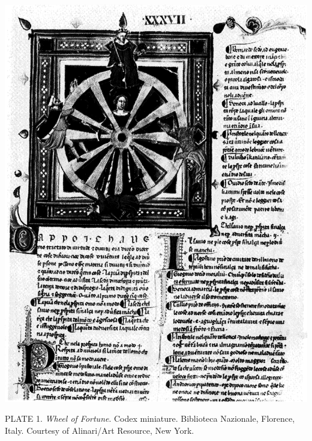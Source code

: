 \protect\hypertarget{20_ILLUSTRATIONS_FOLLOW_PAGE.xhtmlux5cux23id_2}{}{}\includegraphics{include/html/images/322_1.png}

PLATE 1. \emph{Wheel of Fortune}. Codex miniature. Biblioteca Nazionale,
Florence, Italy. Courtesy of Alinari/Art Resource, New York.

